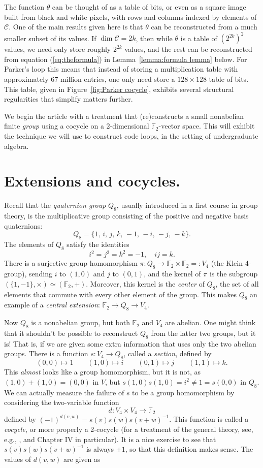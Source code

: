 \documentclass{article}
\theoremstyle{plain}
\theoremstyle{definition}
\def \cC {\mathcal{C}}
\def \FF {\mathbb{F}}
\begin{document}
The function $\theta$ can be thought of as a table of bits, or even as a square image built from black and white pixels, with rows and columns indexed by elements of $\cC$. 
One of the main results given here is that $\theta$ can be reconstructed from a much smaller subset of its values. 
If $\dim\cC = 2k$, then while $\theta$ is a table of $(2^{2k})^2$ values, we need only store roughly $2^{2k}$ values, and the rest can be reconstructed from equation (\ref{eq:theformula}) in Lemma~\ref{lemma:formula lemma} below. 
For Parker's loop this means that instead of storing a multiplication table with approximately $67$ million entries, one only need store a $128\times 128$ table of bits. 
This table, given in Figure~\ref{fig:Parker cocycle}, exhibits several structural regularities that simplify matters further.


We begin the article with a treatment that (re)constructs a small nonabelian finite \emph{group} using a cocycle on a 2-dimensional $\FF_2$-vector space.
This will exhibit the technique we will use to construct code loops, in the setting of undergraduate algebra.


\section{Extensions and cocycles.}


Recall that the \emph{quaternion group} $Q_8$, usually introduced in a first course in group theory, is the multiplicative group consisting of the positive and negative basis quaternions:
\[
	Q_8 = \{1,\, i,\, j,\, k,\,-1,\, -i,\, -j,\, -k\}.
\]
The elements of $Q_8$ satisfy the identities
\[
	i^2 = j^2 = k^2 = -1, \quad ij=k.
\]
There is a surjective group homomorphism $\pi\colon Q_8 \to \FF_2 \times \FF_2 =: V_4$ (the Klein 4-group), sending $i$ to $(1,0)$ and $j$ to $(0,1)$, and the kernel of $\pi$ is the subgroup $(\{1,-1\},\times)\simeq (\FF_2,+)$.
Moreover, this kernel is the \emph{center} of $Q_8$, the set of all elements that commute with every other element of the group. This makes $Q_8$ an example of a \emph{central extension}: $\FF_2\to Q_8 \to V_4$.

Now $Q_8$ is a nonabelian group, but both $\FF_2$ and $V_4$ are abelian.
One might think that it shouldn't be possible to reconstruct $Q_8$ from the latter two groups, but it is! 
That is, if we are given some extra information that uses only the two abelian groups.
There is a function $s\colon V_4 \to Q_8$, called a \emph{section}, defined by 
\[
(0,0) \mapsto 1\qquad
(1,0) \mapsto i\qquad
(0,1) \mapsto j\qquad
(1,1) \mapsto k.
\]
This \emph{almost} looks like a group homomorphism, but it is not, as $(1,0) + (1,0) = (0,0)$ in $V$, but $s(1,0)s(1,0) = i^2 \not= 1 = s(0,0)$ in $Q_8$.
We can actually measure the failure of $s$ to be a group homomorphism by considering the two-variable function
\[
	d\colon V_4 \times V_4 \to \FF_2
\]
defined by $ (-1)^{d(v,w)} = s(v)s(w)s(v+w)^{-1}$. 
This function is called a \emph{cocycle}, or more properly a 2-cocycle (for a treatment of the general theory, see, e.g., \cite{Brown}, and Chapter IV in particular).
It is a nice exercise to see that $s(v)s(w)s(v+w)^{-1}$ is always $\pm 1$, so that this definition makes sense. The values of $d(v,w)$ are given as
\end{document}
